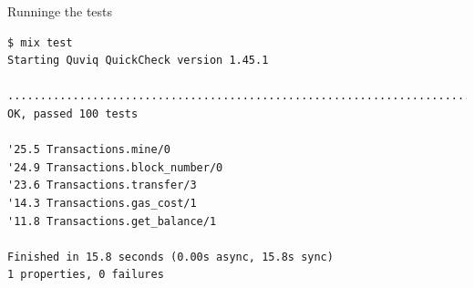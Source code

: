 \documentclass[aspectratio=169, 10pt]{beamer}
\begin{document}
\begin{frame}[label={sec:org9064465},fragile]{Runninge the tests}
 \lstset{language=elixir,label= ,caption= ,captionpos=b,numbers=none,style=display}
\begin{lstlisting}
$ mix test
Starting Quviq QuickCheck version 1.45.1

....................................................................................................
OK, passed 100 tests

'25.5 Transactions.mine/0
'24.9 Transactions.block_number/0
'23.6 Transactions.transfer/3
'14.3 Transactions.gas_cost/1
'11.8 Transactions.get_balance/1

Finished in 15.8 seconds (0.00s async, 15.8s sync)
1 properties, 0 failures
\end{lstlisting}
\end{frame}
\end{document}
